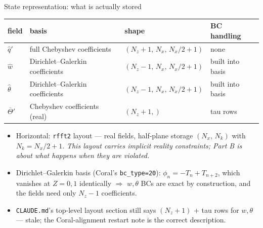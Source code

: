 \documentclass[aspectratio=169,10pt]{beamer}
\newcommand{\Tb}{\overline{\Theta}}
\newcommand{\file}[1]{\textcolor{blue!60!black}{\texttt{#1}}}
\begin{document}
\begin{frame}{State representation: what is actually stored}
  \begin{center}
  \small
  \begin{tabular}{@{}llll@{}}
    \toprule
    field & basis & shape & BC handling \\
    \midrule
    $\hat q'$ & full Chebyshev coefficients & $(N_z{+}1,\,N_x,\,N_x/2{+}1)$ & none \\
    $\hat w$ & Dirichlet--Galerkin coefficients & $(N_z{-}1,\,N_x,\,N_x/2{+}1)$ & built into basis \\
    $\hat\theta$ & Dirichlet--Galerkin coefficients & $(N_z{-}1,\,N_x,\,N_x/2{+}1)$ & built into basis \\
    $\Tb'$ & Chebyshev coefficients (real) & $(N_z{+}1,)$ & tau rows \\
    \bottomrule
  \end{tabular}
  \end{center}
  \begin{itemize}
    \item Horizontal: \texttt{rfft2} layout --- real fields, half-plane storage
      $(N_x,\,N_k)$ with $N_k = N_x/2+1$. \emph{This layout carries implicit
      reality constraints; Part B is about what happens when they are violated.}
    \item Dirichlet--Galerkin basis (Coral's \texttt{bc\_type=20}):
      $\phi_n = -T_n + T_{n+2}$, which vanishes at $Z=0,1$ identically
      $\Rightarrow$ $w,\theta$ BCs are exact by construction, and the fields
      need only $N_z-1$ coefficients.
    \item \file{CLAUDE.md}'s top-level layout section still says $(N_z{+}1)$
      + tau rows for $w,\theta$ --- stale; the Coral-alignment restart note is the
      correct description.
  \end{itemize}
\end{frame}
\end{document}
